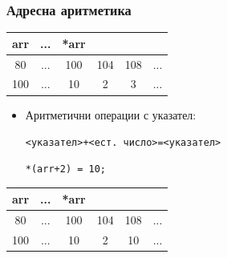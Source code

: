 \documentclass{beamer}
\begin{document}
\begin{frame}[fragile]
\frametitle{Адресна аритметика}


\begin{tabular} {c | c | c | c | c | c }

arr &... &*arr \\\hline
80  &... & 100 & 104 & 108 &... \\\hline
100 &... & 10   & 2   & 3   &... \\\hline

\end{tabular}


\begin{itemize}
  \item Аритметични операции с указател:

\texttt{<указател>+<ест. число>=<указател>}
\begin{flushleft}
\begin{lstlisting}
*(arr+2) = 10;
\end{lstlisting}
\end{flushleft}

\end{itemize}

\pause
\begin{tabular} {c | c | c | c | c | c }

arr &... &*arr \\\hline
80  &... & 100 & 104 & 108 &... \\\hline
100 &... & 10   & 2   & \alert{10}   &... \\\hline

\end{tabular}

\end{frame}
\end{document}
